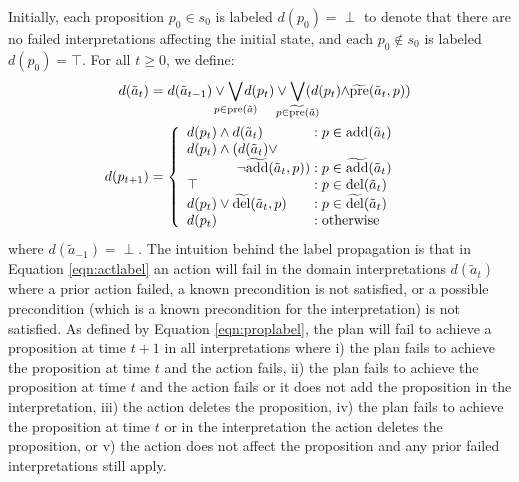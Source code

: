 \documentclass[letterpaper]{article}
\begin{document}
Initially, each proposition $p_0 \in s_0$ is labeled $d(p_0) = \perp$ to denote
that there are no failed interpretations affecting the initial state, and each
$p_0 \not\in s_0$ is labeled $d(p_0)=\top$.  For all $t \geq 0$, we define:
\begin{align}
\label{eqn:actlabel}d(\tilde{a}_t) &=  
d(\tilde{a}_{t-1}) \vee \hspace*{-.35cm}\bigvee\limits_{p \in \text{pre}(\tilde{a})}\hspace*{-.39cm} d(p_t) \vee\hspace*{-.35cm} \bigvee\limits_{p \in \widetilde{\text{pre}}(\tilde{a})} \hspace*{-.35cm}(d(p_t)\hspace*{-.09cm}\wedge\hspace*{-.09cm} \widetilde{\text{pre}}(\tilde{a}_t, p)  ) \\
\label{eqn:proplabel}\hspace*{-.1cm}d(p_{t+1}) &= \left\{
\begin{array}{l@{\;}l@{\;}r}
d(p_t) \wedge d(\tilde{a}_t) & : p \in \text{add}(\tilde{a}_t) \\
d(p_t) \wedge  (d(\tilde{a}_t) \vee \\
\hspace*{1.25cm} \neg\widetilde{\text{add}}(\tilde{a}_t, p)) & : p \in \widetilde{\text{add}}(\tilde{a}_t)\\
\top & : p \in \text{del}(\tilde{a}_t)\\
d(p_t) \vee  \widetilde{\text{del}}(\tilde{a}_t, p) 
 &: p \in \widetilde{\text{del}}(\tilde{a}_t)\\
d(p_t) & : \text{otherwise} 
\end{array}
\right. 
\end{align}
\noindent where $d(\tilde{a}_{-1}) = \perp$. The intuition behind the label
propagation is that in Equation \ref{eqn:actlabel} an action will fail  in the
domain interpretations $d(\tilde{a}_t)$ where a prior action failed, a known
precondition is not satisfied, or a possible precondition (which is a known
precondition for the interpretation) is not satisfied. As defined by Equation
\ref{eqn:proplabel}, the plan will fail to achieve a proposition at time $t+1$
in all interpretations where i) the plan fails to achieve the proposition at
time $t$ and the action fails, ii) the plan fails to achieve the proposition at
time $t$ and the action fails or it does not add the proposition in the
interpretation, iii) the action deletes the proposition, iv) the plan fails to
achieve the proposition at time $t$ or in the interpretation the action deletes
the proposition, or v) the action does not affect the proposition and any prior
failed interpretations still apply.
\end{document}
